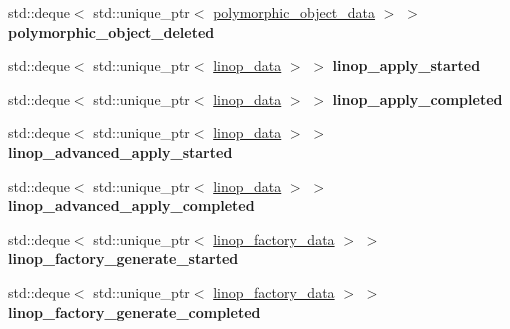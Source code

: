 \begin{DoxyCompactItemize}
std\+::deque$<$ std\+::unique\+\_\+ptr$<$ \hyperlink{structgko_1_1log_1_1polymorphic__object__data}{polymorphic\+\_\+object\+\_\+data} $>$ $>$ {\bfseries polymorphic\+\_\+object\+\_\+deleted}
\item 
\mbox{\label{structgko_1_1log_1_1Record_1_1logged__data_ae3d775a94131fbdd7a94821b17b6b3b0}} 
std\+::deque$<$ std\+::unique\+\_\+ptr$<$ \hyperlink{structgko_1_1log_1_1linop__data}{linop\+\_\+data} $>$ $>$ {\bfseries linop\+\_\+apply\+\_\+started}
\item 
\mbox{\label{structgko_1_1log_1_1Record_1_1logged__data_ae39a65143824c08e63f4a076b1bd0873}} 
std\+::deque$<$ std\+::unique\+\_\+ptr$<$ \hyperlink{structgko_1_1log_1_1linop__data}{linop\+\_\+data} $>$ $>$ {\bfseries linop\+\_\+apply\+\_\+completed}
\item 
\mbox{\label{structgko_1_1log_1_1Record_1_1logged__data_a4158a08b810c816428b63cfc7cb48a90}} 
std\+::deque$<$ std\+::unique\+\_\+ptr$<$ \hyperlink{structgko_1_1log_1_1linop__data}{linop\+\_\+data} $>$ $>$ {\bfseries linop\+\_\+advanced\+\_\+apply\+\_\+started}
\item 
\mbox{\label{structgko_1_1log_1_1Record_1_1logged__data_a1f52757c1003b053341c9766d4bf22e1}} 
std\+::deque$<$ std\+::unique\+\_\+ptr$<$ \hyperlink{structgko_1_1log_1_1linop__data}{linop\+\_\+data} $>$ $>$ {\bfseries linop\+\_\+advanced\+\_\+apply\+\_\+completed}
\item 
\mbox{\label{structgko_1_1log_1_1Record_1_1logged__data_a0b6e60c1ee1ea3493aac81ec4b416b4f}} 
std\+::deque$<$ std\+::unique\+\_\+ptr$<$ \hyperlink{structgko_1_1log_1_1linop__factory__data}{linop\+\_\+factory\+\_\+data} $>$ $>$ {\bfseries linop\+\_\+factory\+\_\+generate\+\_\+started}
\item 
\mbox{\label{structgko_1_1log_1_1Record_1_1logged__data_a043ccd4db0cb835dcdd0b1bfa4dbf24b}} 
std\+::deque$<$ std\+::unique\+\_\+ptr$<$ \hyperlink{structgko_1_1log_1_1linop__factory__data}{linop\+\_\+factory\+\_\+data} $>$ $>$ {\bfseries linop\+\_\+factory\+\_\+generate\+\_\+completed}

\end{DoxyCompactItemize}
